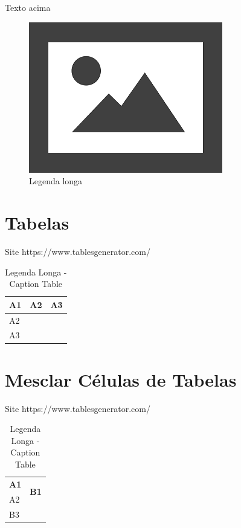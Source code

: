 \documentclass[12pt]{article}
\begin{document}
Texto acima

\begin{figure}[H]
	\centering
	\includegraphics[width=0.7\linewidth]{Figuras/fig3}
	\caption[Legenda curta]{Legenda longa}
	\label{fig:figura_generica}
\end{figure}


\newpage
\section{Tabelas}

Site https://www.tablesgenerator.com/

\begin{table}[H]
	\centering
	\caption[legenda curta]{Legenda Longa - Caption Table}
	\label{tab:tab_original}
	\begin{tabular}{|l|l|l|}
		\hline
		\textbf{A1} & \textbf{A2} & \textbf{A3} \\ \hline
		A2          &             &             \\ \hline
		A3          &             &             \\ \hline
	\end{tabular}
\end{table}

\newpage
\section{Mesclar Células de Tabelas}

Site https://www.tablesgenerator.com/

\renewcommand{\arraystretch}{1.5}
\begin{table}[H]
	\centering
	\caption[legenda curta]{Legenda Longa - Caption Table}
	\label{tab:Label Table}
	\begin{tabular}{|l|l|l|}
		\hline
		\textbf{A1} & \multicolumn{2}{l|}{\multirow{2}{*}{\textbf{B1}}}\\ \cline{1-1}
		A2          &  \multicolumn{2}{l|}{}          \\ \hline
		B3          &             &                   \\ \hline
	\end{tabular}
\end{table}
\end{document}
